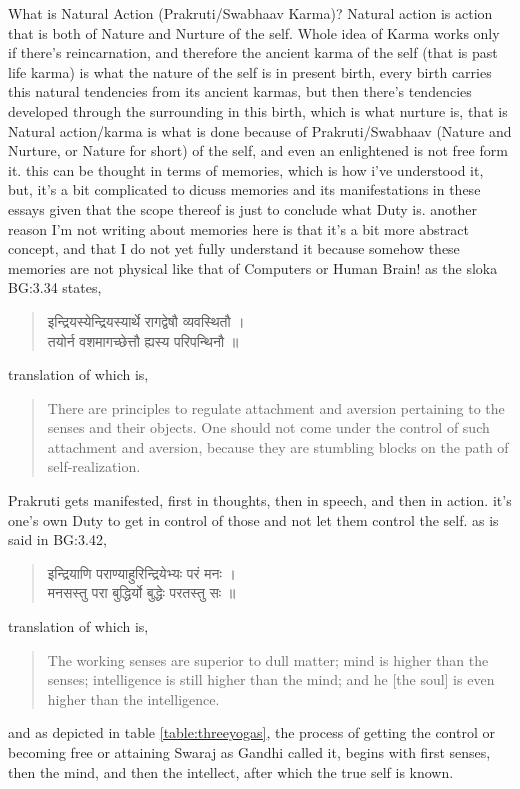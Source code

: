 \documentclass[a4paper]{article}
\begin{document}
What is Natural Action (Prakruti/Swabhaav Karma)? Natural action is action that is both of Nature and 
Nurture of the self. Whole idea of Karma works only if there's reincarnation, and therefore the 
ancient karma of the self (that is past life karma) is what the nature of the self is in present birth,
every birth carries this natural tendencies from its ancient karmas, but then there's tendencies 
developed through the surrounding in this birth, which is what nurture is, that is Natural action/karma
is what is done because of Prakruti/Swabhaav (Nature and Nurture, or Nature for short) of the self, and even an enlightened is not 
free form it. this can be thought in terms 
of memories, which is how i've understood it, but, it's a bit complicated to dicuss memories and 
its manifestations in these essays given that the scope thereof is just to conclude what Duty is.
another reason I'm not writing about memories here is that it's a bit more abstract concept, and that
I do not yet fully understand it because somehow these memories are not physical like that of 
Computers or Human Brain! as the sloka BG:3.34
states,
\begin{quote}
    \begin{sanskrit}
    इन्द्रियस्येन्द्रियस्यार्थे रागद्वेषौ व्यवस्थितौ ।
    \\तयोर्न वशमागच्छेत्तौ ह्यस्य परिपन्थिनौ ॥ 
    \end{sanskrit}
\end{quote}
translation of which is,
\begin{quote}
    There are principles to regulate attachment and aversion pertaining to the senses and their objects. One should not come under the control of such attachment and aversion, because they are stumbling blocks on the path of self-realization.
\end{quote}
Prakruti gets manifested, first in thoughts, then in speech, and then in action. it's one's own Duty to 
get in control of those and not let them control the self. as is said in BG:3.42,
\begin{quote}
    \begin{sanskrit}
    इन्द्रियाणि पराण्याहुरिन्द्रियेभ्यः परं मनः ।
    \\मनसस्तु परा बुद्धिर्यो बुद्धेः परतस्तु सः ॥
    \end{sanskrit}
\end{quote}
translation of which is,
\begin{quote}
    The working senses are superior to dull matter; mind is higher than the senses; intelligence is still higher than the mind; and he [the soul] is even higher than the intelligence.
\end{quote}
and as depicted in table \ref{table:threeyogas}, the process of getting the control or becoming free or
attaining Swaraj as Gandhi called it, begins with first senses, then the mind, and then the intellect, 
after which the true self is known. 
\end{document}
